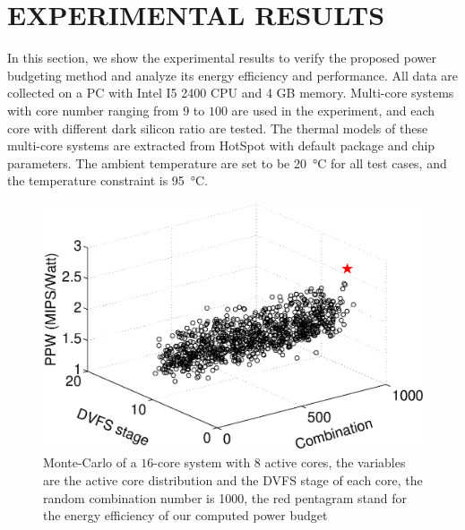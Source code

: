 \section{EXPERIMENTAL RESULTS}
In this section, we show the experimental results to verify the proposed power budgeting method and analyze its energy efficiency and performance. All data are collected on a PC with Intel I5 2400 CPU and 4 GB memory. Multi-core systems with core number ranging from $9$ to $100$ are used in the experiment, and each core with different dark silicon ratio are tested. The thermal models of these multi-core systems are extracted from HotSpot with default package and chip parameters. The ambient temperature are set to be \SI{20}{\degreeCelsius} for all test cases, and the temperature constraint is \SI{95}{\degreeCelsius}.


\begin{figure}
\centering
\includegraphics[width=1\linewidth]{fig/best_steady.eps}
\caption{Monte-Carlo of a $16$-core system with $8$ active cores, the variables are the active core distribution and the DVFS stage of each core, the random combination number is 1000, the red pentagram stand for the energy efficiency of our computed power budget}
\end{figure}



